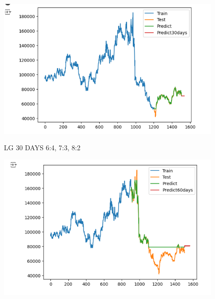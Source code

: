 \documentclass{article}
\begin{document}
\begin{multicols}{2}
\begin{figure}[H]
\begin{minipage}{0.15\textwidth}
    \label{fig:2}
    \end{minipage}%
    \begin{minipage}{0.15\textwidth}
    \centering
    \includegraphics[width=1\textwidth]{Image/GradientBoosting/LG_30_8_2_GradientBoostingRegressor.png}

    \label{fig:3}
    \end{minipage}
    \caption{LG 30 DAYS  6:4, 7:3, 8:2 }
\end{figure}

\begin{figure}[H]
    \centering
    \begin{minipage}{0.15\textwidth}
    \centering
    \includegraphics[width=1\textwidth]{Image/GradientBoosting/LG_60_6_4_GradientBoostingRegressor.png}
   

\end{minipage}
\end{figure}
\end{multicols}
\end{document}
